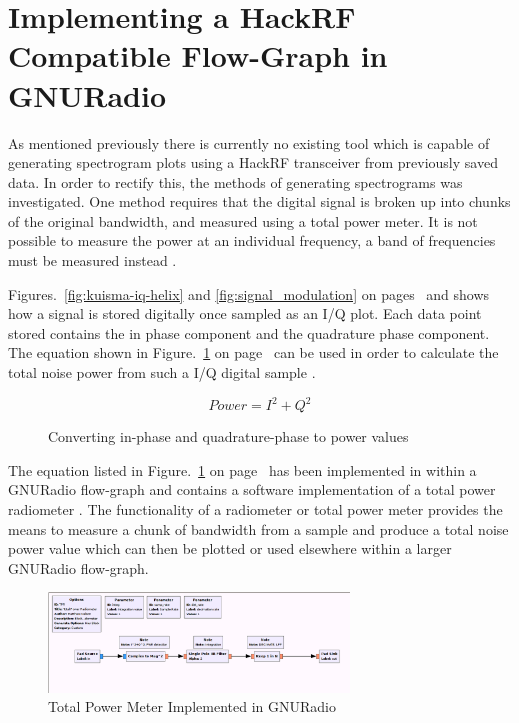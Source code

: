 \newpage
\section*{Implementing a HackRF Compatible Flow-Graph in GNURadio}

As mentioned previously there is currently no existing tool which is capable of generating spectrogram plots using a HackRF transceiver from previously saved data. In order to rectify this, the methods of generating spectrograms was investigated. One method requires that the digital signal is broken up into chunks of the original bandwidth, and measured using a total power meter. It is not possible to measure the power at an individual frequency, a band of frequencies must be measured instead \citep{keen-15}.

Figures.~\ref{fig:kuisma-iq-helix} and \ref{fig:signal_modulation} on pages~\pageref{fig:kuisma-iq-helix} and \pageref{fig:signal_modulation} shows how a signal is stored digitally once sampled as an I/Q plot. Each data point stored contains the in phase component and the quadrature phase component. The equation shown in Figure.~\ref{fig:power_formula} on page~\pageref{fig:power_formula} can be used in order to calculate the total noise power from such a I/Q digital sample \citep{nelson-15}.

%
\begin{figure}[here]
	\centering
	\begin{equation}
	Power = I^2 + Q^2
	\end{equation}
	\caption{Converting in-phase and quadrature-phase to power values}
	\label{fig:power_formula}
\end{figure}
%

The equation listed in Figure.~\ref{fig:power_formula} on page~\pageref{fig:power_formula} has been implemented in within a GNURadio flow-graph and contains a software implementation of a total power radiometer \citep{nelson-15}. The functionality of a radiometer or total power meter provides the means to measure a chunk of bandwidth from a sample and produce a total noise power value which can then be plotted or used elsewhere within a larger GNURadio flow-graph.

%
\begin{figure}[!htb]
	\centering
	\includegraphics[width=8cm]{images/17}
	\caption{Total Power Meter Implemented in GNURadio \citep{nelson-15}}
	\label{fig:sdr_total_power_meter} 
\end{figure}
%

